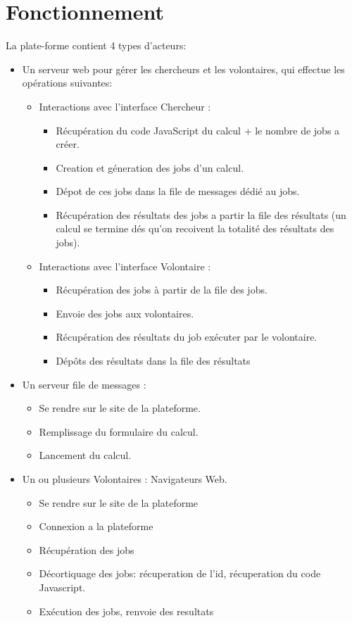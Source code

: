 \documentclass[a4paper]{article}
\begin{document}
\section{Fonctionnement}
La plate-forme contient 4 types d'acteurs:
\begin{itemize}
\item Un serveur web pour gérer les chercheurs et les volontaires, qui effectue les opérations suivantes:
\begin{itemize}

\item Interactions avec l'interface Chercheur :
\begin{itemize}
\item Récupération du code JavaScript du calcul + le nombre de jobs a créer.
\item Creation et géneration des jobs d'un calcul.
\item Dépot de ces jobs dans la file de messages dédié au jobs.
\item Récupération des résultats des jobs a partir la file des résultats (un calcul se termine dés qu'on recoivent la totalité des résultats des jobs).
\end{itemize}

\item Interactions avec l'interface Volontaire :
\begin{itemize}
\item Récupération des jobs à partir de la file des jobs.
\item Envoie des jobs aux volontaires.
\item Récupération des résultats du job exécuter par le volontaire.
\item Dépôts des résultats dans la file des résultats
\end{itemize} 
\end{itemize}

\item Un serveur file de messages :
\begin{itemize}
\item Se rendre sur le site de la plateforme.
\item Remplissage du formulaire du calcul.
\item Lancement du calcul. 
\end{itemize}

\item Un ou plusieurs Volontaires : Navigateurs Web.
\begin{itemize}
\item Se rendre sur le site de la plateforme
\item Connexion a la plateforme
\item Récupération des jobs
\item Décortiquage des jobs: récuperation de l'id, récuperation du code Javascript.
\item Exécution des jobs, renvoie des resultats
\end{itemize} 


\end{itemize}
\end{document}
